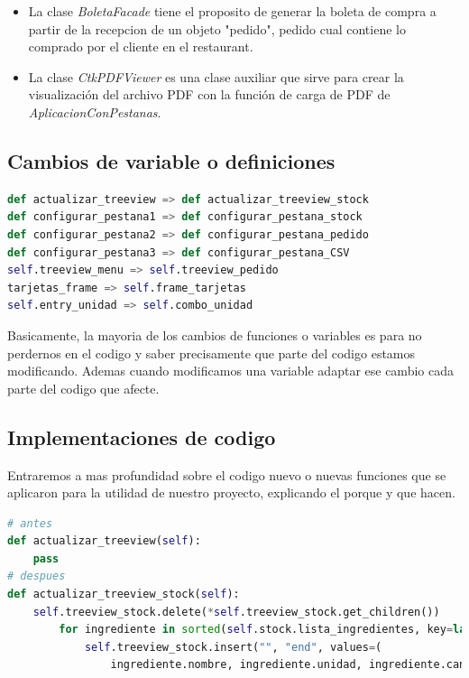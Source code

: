 \documentclass[a4paper,12pt]{article}
\begin{document}
\begin{itemize}
    \item La clase \textit{BoletaFacade} tiene el proposito de generar la boleta de compra a partir de la recepcion de un objeto "pedido", pedido cual contiene lo comprado por el cliente en el restaurant.
    
    \item La clase \textit{CtkPDFViewer} es una clase auxiliar que sirve para crear la visualización del archivo PDF con la función de carga de PDF de \textit{AplicacionConPestanas}.
\end{itemize}

\subsection{Cambios de variable o definiciones}

\begin{lstlisting}[language=Python, caption={Cambios de definiciones o variables}, frame=single]
def actualizar_treeview => def actualizar_treeview_stock
def configurar_pestana1 => def configurar_pestana_stock
def configurar_pestana2 => def configurar_pestana_pedido
def configurar_pestana3 => def configurar_pestana_CSV
self.treeview_menu => self.treeview_pedido
tarjetas_frame => self.frame_tarjetas
self.entry_unidad => self.combo_unidad
\end{lstlisting}

Basicamente, la mayoria de los cambios de funciones o variables es para no perdernos en el codigo y saber precisamente que parte del codigo estamos modificando. Ademas cuando modificamos una variable adaptar ese cambio cada parte del codigo que afecte.

\subsection{Implementaciones de codigo}

Entraremos a mas profundidad sobre el codigo nuevo o nuevas funciones que se aplicaron para la utilidad de nuestro proyecto, explicando el porque y que hacen.

\begin{lstlisting}[language=Python, caption={Implementaciones de codigo}, frame=single]
# antes
def actualizar_treeview(self):
    pass
# despues
def actualizar_treeview_stock(self):
    self.treeview_stock.delete(*self.treeview_stock.get_children())
        for ingrediente in sorted(self.stock.lista_ingredientes, key=lambda item: item.nombre):
            self.treeview_stock.insert("", "end", values=(
                ingrediente.nombre, ingrediente.unidad, ingrediente.cantidad))
\end{lstlisting}
\end{document}
